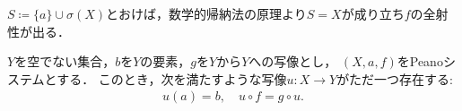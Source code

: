 	\begin{prf}
		$S \coloneqq \{a\} \cup \sigma(X)$とおけば，数学的帰納法の原理より$S = X$が成り立ち$f$の全射性が出る．
		\QED
	\end{prf}
	
	\begin{screen}
		\begin{thm}[再帰定理]\label{thm:Peano_recursion_theorem}
			$Y$を空でない集合，$b$を$Y$の要素，$g$を$Y$から$Y$への写像とし，
			$(X,a,f)$をPeanoシステムとする．
			このとき，次を満たすような写像$u:X \longrightarrow Y$がただ一つ存在する:
			\begin{align}
				u(a) = b,\quad u \circ f = g \circ u.
				\label{eq:thm_Peano_recursion_theorem}
			\end{align}
		\end{thm}
	\end{screen}
	
